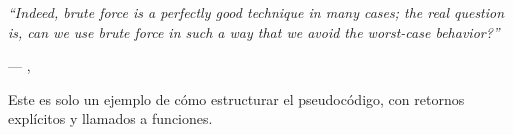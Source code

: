 \epigraph{\textit{``Indeed, brute force is a perfectly good technique in many cases; the real question is, can we use brute force in such a way that we avoid the worst-case behavior?''}}{--- \citeauthor{taocv3}, \citeyear{taocv3} \cite{taocv3}}

\begin{algorithm}[H]
    
    \DontPrintSemicolon
    \footnotesize


    \caption{Este es solo un ejemplo de cómo estructurar el pseudocódigo, con retornos explícitos y llamados a funciones.}
    \label{alg:mi_algoritmo_1}
\end{algorithm}